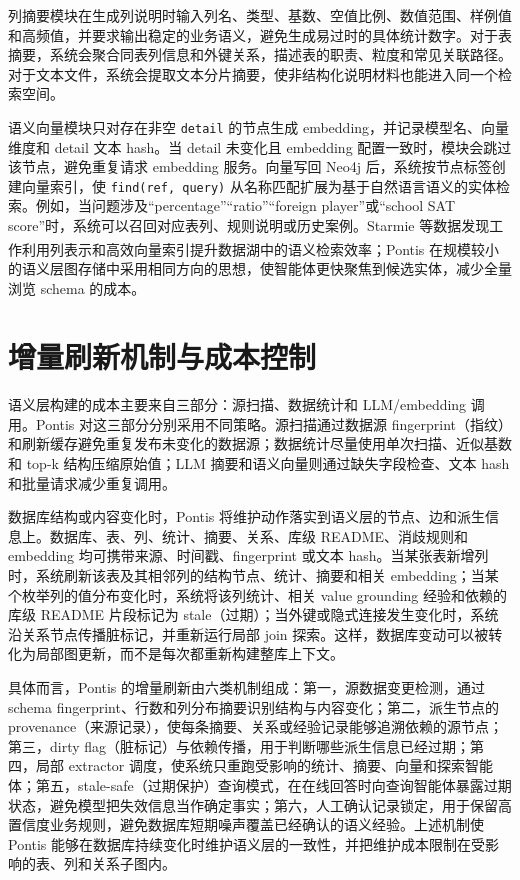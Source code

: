 \documentclass[
    bachelor,
    pdflinks,
]{xjtuthesis}
\newcommand{\upcite}[1]{\textsuperscript{\cite{#1}}}
\begin{document}
列摘要模块在生成列说明时输入列名、类型、基数、空值比例、数值范围、样例值和高频值，并要求输出稳定的业务语义，避免生成易过时的具体统计数字。对于表摘要，系统会聚合同表列信息和外键关系，描述表的职责、粒度和常见关联路径。对于文本文件，系统会提取文本分片摘要，使非结构化说明材料也能进入同一个检索空间。

语义向量模块只对存在非空 \texttt{detail} 的节点生成 embedding，并记录模型名、向量维度和 detail 文本 hash。当 detail 未变化且 embedding 配置一致时，模块会跳过该节点，避免重复请求 embedding 服务。向量写回 Neo4j 后，系统按节点标签创建向量索引，使 \texttt{find(ref, query)} 从名称匹配扩展为基于自然语言语义的实体检索。例如，当问题涉及“percentage”“ratio”“foreign player”或“school SAT score”时，系统可以召回对应表列、规则说明或历史案例。Starmie 等数据发现工作利用列表示和高效向量索引提升数据湖中的语义检索效率\upcite{fan2023starmie}；Pontis 在规模较小的语义层图存储中采用相同方向的思想，使智能体更快聚焦到候选实体，减少全量浏览 schema 的成本。

\section{增量刷新机制与成本控制}

语义层构建的成本主要来自三部分：源扫描、数据统计和 LLM/embedding 调用。Pontis 对这三部分分别采用不同策略。源扫描通过数据源 fingerprint（指纹）和刷新缓存避免重复发布未变化的数据源；数据统计尽量使用单次扫描、近似基数和 top-k 结构压缩原始值；LLM 摘要和语义向量则通过缺失字段检查、文本 hash 和批量请求减少重复调用。

数据库结构或内容变化时，Pontis 将维护动作落实到语义层的节点、边和派生信息上。数据库、表、列、统计、摘要、关系、库级 README、消歧规则和 embedding 均可携带来源、时间戳、fingerprint 或文本 hash。当某张表新增列时，系统刷新该表及其相邻列的结构节点、统计、摘要和相关 embedding；当某个枚举列的值分布变化时，系统将该列统计、相关 value grounding 经验和依赖的库级 README 片段标记为 stale（过期）；当外键或隐式连接发生变化时，系统沿关系节点传播脏标记，并重新运行局部 join 探索。这样，数据库变动可以被转化为局部图更新，而不是每次都重新构建整库上下文。

具体而言，Pontis 的增量刷新由六类机制组成：第一，源数据变更检测，通过 schema fingerprint、行数和列分布摘要识别结构与内容变化；第二，派生节点的 provenance（来源记录），使每条摘要、关系或经验记录能够追溯依赖的源节点；第三，dirty flag（脏标记）与依赖传播，用于判断哪些派生信息已经过期；第四，局部 extractor 调度，使系统只重跑受影响的统计、摘要、向量和探索智能体；第五，stale-safe（过期保护）查询模式，在在线回答时向查询智能体暴露过期状态，避免模型把失效信息当作确定事实；第六，人工确认记录锁定，用于保留高置信度业务规则，避免数据库短期噪声覆盖已经确认的语义经验。上述机制使 Pontis 能够在数据库持续变化时维护语义层的一致性，并把维护成本限制在受影响的表、列和关系子图内。
\end{document}
